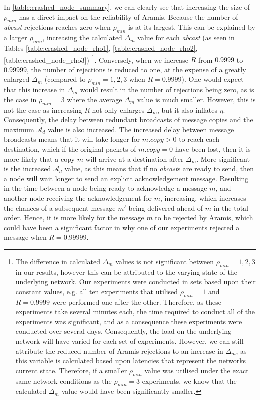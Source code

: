     In \ref{table:crashed_node_summary}, we can clearly see that increasing the size of $\rho_{min}$ has a direct impact on the reliability of \textsf{Aramis}.  Because the number of \emph{abcast} rejections reaches zero when $\rho_{min}$ is at its largest.  This can be explained by a larger $\rho_{min}$, increasing the calculated $\Delta_m$ value for each \emph{abcast} (as seen in Tables \ref{table:crashed_node_rho1}, \ref{table:crashed_node_rho2},  \ref{table:crashed_node_rho3}) \footnote{The difference in calculated $\Delta_m$ values is not significant between $\rho_{min}=1,2,3$ in our results, however this can be attributed to the varying state of the underlying network.  Our experiments were conducted in sets based upon their constant values, e.g. all ten experiments that utilised $\rho_{min}=1$ and $R=0.9999$ were performed one after the other.  Therefore, as these experiments take several minutes each, the time required to conduct all of the experiments was significant, and as a consequence these experiments were conducted over several days.  Consequently, the load on the underlying network will have varied for each set of experiments.  However, we can still attribute the reduced number of \textsf{Aramis rejections} to an increase in $\Delta_m$, as this variable is calculated based upon latencies that represent the networks current state.  Therefore, if a smaller $\rho_{min}$ value was utilised under the exact same network conditions as the $\rho_{min}=3$ experiments, we know that the calculated $\Delta_m$ value would have been significantly smaller.}.  Conversely, when we increase $R$ from $0.9999$ to $0.99999$, the number of rejections is reduced to one, at the expense of a greatly enlarged $\Delta_m$ (compared to $\rho_{min}=1,2,3$ when $R=0.9999$).  One would expect that this increase in $\Delta_m$ would result in the number of rejections being zero, as is the case in $\rho_{min}=3$ where the average $\Delta_m$ value is much smaller.  However, this is not the case as increasing $R$ not only enlarges $\Delta_m$, but it also inflates $\eta$.  Consequently, the delay between redundant broadcasts of message copies and the maximum $\mathcal{A}_d$ value is also increased.  The increased delay between message broadcasts means that it will take longer for $m.copy > 0$ to reach each destination, which if the original packets of $m.copy = 0$ have been lost, then it is more likely that a copy $m$ will arrive at a destination after $\Delta_m$.  More significant is the increased  $\mathcal{A}_d$ value, as this means that if no \emph{abcast}s are ready to send, then a node will wait longer to send an explicit acknowledgement message.  Resulting in the time between a node being ready to acknowledge a message $m$, and another node receiving the acknowledgement for $m$, increasing, which increases the chances of a subsequent message $m'$ being delivered ahead of $m$ in the total order. Hence, it is more likely for the message $m$ to be rejected by \textsf{Aramis}, which could have been a significant factor in why one of our experiments rejected a message when $R=0.99999$.  
    
